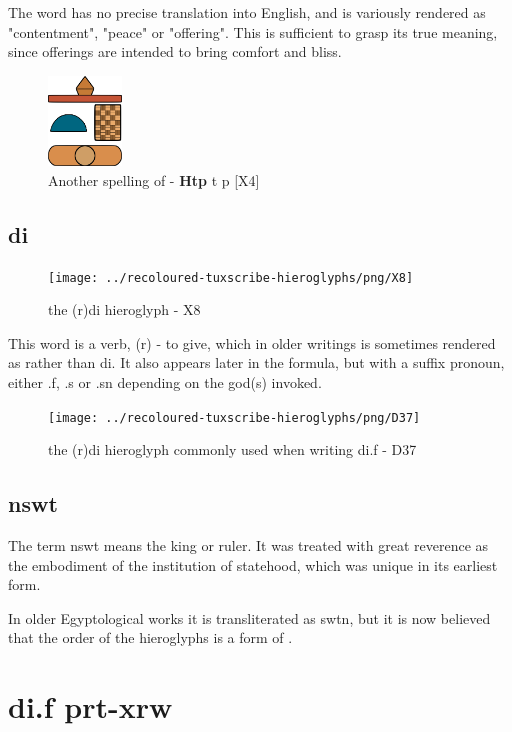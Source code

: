 The word  has no precise translation into English, and is variously rendered as "contentment", "peace" or "offering". This is sufficient to grasp its true meaning, since offerings are intended to bring comfort and bliss.

\begin{figure} [H]
	\centering
	\includegraphics[width=0.175\textwidth]{../images/htp2}
	\caption{Another spelling of  - \textbf{Htp} t p [X4]}
\end{figure}

\subsection*{di}

\begin{figure} [H]
	\centering
	\texttt{[image: ../recoloured-tuxscribe-hieroglyphs/png/X8]}
	\caption{the (r)di hieroglyph - X8}
\end{figure}

This word is a verb, (r) - to give, which in older writings is sometimes rendered as  rather than di. It also appears later in the formula, but with a suffix pronoun, either .f, .s or .sn depending on the god(s) invoked.

\begin{figure} [H]
	\centering
	\texttt{[image: ../recoloured-tuxscribe-hieroglyphs/png/D37]}
	\caption{the (r)di hieroglyph commonly used when writing di.f - D37}
\end{figure}

\subsection*{nswt}

The term nswt means the king or ruler. It was treated with great reverence as the embodiment of the institution of statehood, which was unique in its earliest form.

In older Egyptological works it is transliterated as swtn, but it is now believed that the order of the hieroglyphs is a form of .

\section*{di.f prt-xrw}

